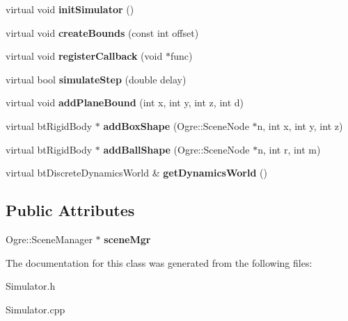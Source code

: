 \begin{DoxyCompactItemize}
\item 
\hypertarget{classSimulator_a6c0dd9962f860e93925a3e4ae8809655}{virtual void {\bfseries init\-Simulator} ()}\label{classSimulator_a6c0dd9962f860e93925a3e4ae8809655}

\item 
\hypertarget{classSimulator_a38c86f8f73f8aa4dac13555692c67eca}{virtual void {\bfseries create\-Bounds} (const int offset)}\label{classSimulator_a38c86f8f73f8aa4dac13555692c67eca}

\item 
\hypertarget{classSimulator_ad35820d07373b65deef417c8c18b7d13}{virtual void {\bfseries register\-Callback} (void $\ast$func)}\label{classSimulator_ad35820d07373b65deef417c8c18b7d13}

\item 
\hypertarget{classSimulator_a6abe3ee406909ab7f03930dfa537a42b}{virtual bool {\bfseries simulate\-Step} (double delay)}\label{classSimulator_a6abe3ee406909ab7f03930dfa537a42b}

\item 
\hypertarget{classSimulator_a043aa34df7dbd5046ed56407ba9b44de}{virtual void {\bfseries add\-Plane\-Bound} (int x, int y, int z, int d)}\label{classSimulator_a043aa34df7dbd5046ed56407ba9b44de}

\item 
\hypertarget{classSimulator_ad9e33ec74ec54f65077de1c8dc28fd5b}{virtual bt\-Rigid\-Body $\ast$ {\bfseries add\-Box\-Shape} (Ogre\-::\-Scene\-Node $\ast$n, int x, int y, int z)}\label{classSimulator_ad9e33ec74ec54f65077de1c8dc28fd5b}

\item 
\hypertarget{classSimulator_a22d1288cafb5a83c3c5c95fc5b58efbb}{virtual bt\-Rigid\-Body $\ast$ {\bfseries add\-Ball\-Shape} (Ogre\-::\-Scene\-Node $\ast$n, int r, int m)}\label{classSimulator_a22d1288cafb5a83c3c5c95fc5b58efbb}

\item 
\hypertarget{classSimulator_a5da2770c96b18da1e5ce575b4652528e}{virtual bt\-Discrete\-Dynamics\-World \& {\bfseries get\-Dynamics\-World} ()}\label{classSimulator_a5da2770c96b18da1e5ce575b4652528e}

\end{DoxyCompactItemize}
\subsection*{Public Attributes}
\begin{DoxyCompactItemize}
\item 
\hypertarget{classSimulator_ab5748cbb0ec57cd4922d2e88766fb8a2}{Ogre\-::\-Scene\-Manager $\ast$ {\bfseries scene\-Mgr}}\label{classSimulator_ab5748cbb0ec57cd4922d2e88766fb8a2}

\end{DoxyCompactItemize}


The documentation for this class was generated from the following files\-:\begin{DoxyCompactItemize}
\item 
Simulator.\-h\item 
Simulator.\-cpp\end{DoxyCompactItemize}
